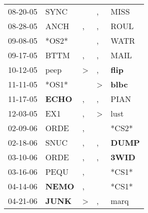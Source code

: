 \begin{supertabular}{p{0.07\textwidth}p{0.06\textwidth}p{0.02\textwidth}p{0.02\textwidth}p{0.06\textwidth}}
          08-20-05\textsuperscript{} &           SYNC\textsuperscript{} &                  &                , &           MISS\textsuperscript{} \\
          08-28-05\textsuperscript{} &           ANCH\textsuperscript{} &                , &                , &           ROUL\textsuperscript{} \\
          09-08-05\textsuperscript{} &                            *OS2* &                  &                , &           WATR\textsuperscript{} \\
          09-17-05\textsuperscript{} &           BTTM\textsuperscript{} &                , &                , &           MAIL\textsuperscript{} \\
          10-12-05\textsuperscript{} &           peep\textsuperscript{} &     \textgreater &                , &  \textbf{flip\textsuperscript{}} \\
          11-11-05\textsuperscript{} &                            *OS1* &                  &     \textgreater &  \textbf{blbc\textsuperscript{}} \\
          11-17-05\textsuperscript{} &  \textbf{ECHO\textsuperscript{}} &                , &                , &           PIAN\textsuperscript{} \\
          12-03-05\textsuperscript{} &            EX1\textsuperscript{} &                , &     \textgreater &           lust\textsuperscript{} \\
          02-09-06\textsuperscript{} &           ORDE\textsuperscript{} &                , &                  &                            *CS2* \\
          02-18-06\textsuperscript{} &           SNUC\textsuperscript{} &                , &                , &  \textbf{DUMP\textsuperscript{}} \\
          03-10-06\textsuperscript{} &           ORDE\textsuperscript{} &                , &                , &  \textbf{3WID\textsuperscript{}} \\
          03-16-06\textsuperscript{} &           PEQU\textsuperscript{} &                , &                  &                            *CS1* \\
          04-14-06\textsuperscript{} &  \textbf{NEMO\textsuperscript{}} &                , &                  &                            *CS1* \\
          04-21-06\textsuperscript{} &  \textbf{JUNK\textsuperscript{}} &     \textgreater &                , &           marq\textsuperscript{} \\

\end{supertabular}
